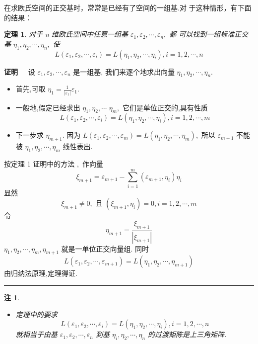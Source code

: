 \documentclass[13pt]{beamer}
\newtheorem{thm}{定理}
\newtheorem*{rem}{注}
\def\qed{\nopagebreak\hfill{\rule{4pt}{7pt}}\medbreak}
\def\pf{{\bf 证明~~ }}
\begin{document}
\begin{frame}
在求欧氏空间的正交基时，常常是已经有了空间的一组基.对 于这种情形，有下面的结果：

\begin{thm}
对于 n 维欧氏空间中任意一组基 ${\varepsilon}_{1}, {\varepsilon}_{2}, \cdots, {\varepsilon}_{n},$ 都
可以找到一组标准正交基 ${\eta}_{1}, {\eta}_{2}, \cdots, {\eta}_{n},$ 使
\[
L\left(\varepsilon_{1}, \varepsilon_{2}, \cdots, \varepsilon_{i}\right)=L\left(\eta_{1}, \eta_{2}, \cdots, \eta_{i}\right), i=1,2, \cdots, n
\]
\end{thm}
\pf 
 设 ${\varepsilon}_{1}, {\varepsilon}_{2}, \cdots, {\varepsilon}_{n}$ 是一组基, 我们来逐个地求出向量
${\eta}_{1}, {\eta}_{2}, \cdots, {\eta}_{n}$.

\begin{itemize}
	\item 首先,可取 ${\eta}_{1}=\frac{1}{\left|{\varepsilon}_{1}\right|} {\varepsilon}_{1} .$ 
	
	\item 一般地,假定已经求出 ${\eta}_{1}, {\eta}_{2}, \cdots$
	${\eta}_{m},$ 它们是单位正交的,具有性质
	\[
	L\left({\varepsilon}_{1}, {\varepsilon}_{2}, \cdots, {\varepsilon}_{i}\right)=L\left({\eta}_{1}, {\eta}_{2}, \cdots, {\eta}_{i}\right), i=1,2, \cdots, m
	\]
	
	\item 下一步求 ${\eta}_{m+1}$. 
	因为 $L\left({\varepsilon}_{1}, {\varepsilon}_{2}, \cdots, {\varepsilon}_{m}\right)=L\left({\eta}_{1}, {\eta}_{2}, \cdots, {\eta}_{m}\right),$ 所以 ${\varepsilon}_{m+1}$ 不能
	被 ${\eta}_{1}, {\eta}_{2}, \cdots, {\eta}_{m}$ 线性表出.
\end{itemize}
\end{frame}


\begin{frame}	
	按定理 1 证明中的方法 $,$ 作向量
	\[
	\xi_{m+1}=\varepsilon_{m+1}-\sum_{i=1}^{m}\left(\varepsilon_{m+1}, \eta_{i}\right) \eta_{i}
	\]
	显然
	\[
	\xi_{m+1} \neq 0, \text { 且 }\left(\xi_{m+1}, \eta_{i}\right)=0, i=1,2, \cdots, m
	\]
	令
	\[
	{\eta}_{m+1}=\frac{{\xi}_{m+1}}{\left|{\xi}_{m+1}\right|}
	\]
	${\eta}_{1}, {\eta}_{2}, \cdots, {\eta}_{m}, {\eta}_{m+1}$ 就是一单位正交向量组.
	同时
	\[
	L\left({\varepsilon}_{1}, {\varepsilon}_{2}, \cdots, {\varepsilon}_{m+1}\right)=L\left({\eta}_{1}, {\eta}_{2}, \cdots, {\eta}_{m+1}\right)
	\]
	由归纳法原理,定理得证.  
\qed

\end{frame}

\begin{frame}
\begin{rem}
\begin{itemize}
	\item 定理中的要求
	\[
	L\left(\varepsilon_{1}, \varepsilon_{2}, \cdots, \varepsilon_{i}\right)=L\left(\eta_{1}, \eta_{2}, \cdots, \eta_{i}\right), i=1,2, \cdots, n
	\]
	就相当于由基 ${\varepsilon}_{1}, {\varepsilon}_{2}, \cdots, {\varepsilon}_{n}$ 到基 ${\eta}_{i}, {\eta}_{2}, \cdots, {\eta}_{n}$ 的过渡矩陈是上三角矩阵.
\end{itemize}
\end{rem}
\end{frame}
\end{document}
